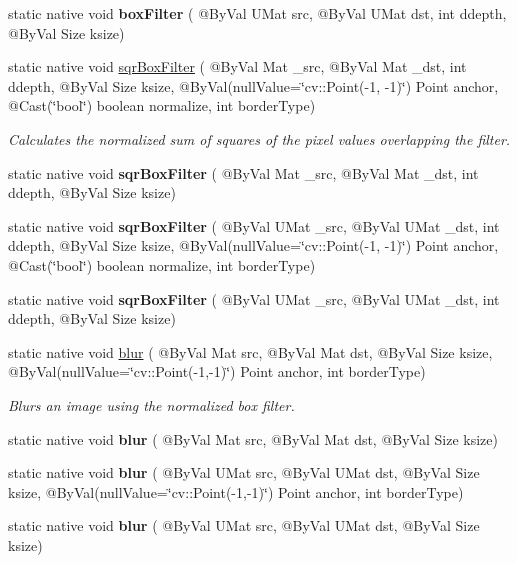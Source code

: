 \begin{DoxyCompactItemize}
\item 
static native void {\bfseries box\+Filter} ( @By\+Val U\+Mat src, @By\+Val U\+Mat dst, int ddepth, @By\+Val Size ksize)
\item 
static native void \hyperlink{group__imgproc__filter_gac3bb5f90c81da13be223978755c103e2}{sqr\+Box\+Filter} ( @By\+Val Mat \+\_\+src, @By\+Val Mat \+\_\+dst, int ddepth, @By\+Val Size ksize, @By\+Val(null\+Value=\char`\"{}cv\+::\+Point(-\/1, -\/1)\char`\"{}) Point anchor, @Cast(\char`\"{}bool\char`\"{}) boolean normalize, int border\+Type)
\begin{DoxyCompactList}\small\item\em Calculates the normalized sum of squares of the pixel values overlapping the filter. \end{DoxyCompactList}\item 
static native void {\bfseries sqr\+Box\+Filter} ( @By\+Val Mat \+\_\+src, @By\+Val Mat \+\_\+dst, int ddepth, @By\+Val Size ksize)
\item 
static native void {\bfseries sqr\+Box\+Filter} ( @By\+Val U\+Mat \+\_\+src, @By\+Val U\+Mat \+\_\+dst, int ddepth, @By\+Val Size ksize, @By\+Val(null\+Value=\char`\"{}cv\+::\+Point(-\/1, -\/1)\char`\"{}) Point anchor, @Cast(\char`\"{}bool\char`\"{}) boolean normalize, int border\+Type)
\item 
static native void {\bfseries sqr\+Box\+Filter} ( @By\+Val U\+Mat \+\_\+src, @By\+Val U\+Mat \+\_\+dst, int ddepth, @By\+Val Size ksize)
\item 
static native void \hyperlink{group__imgproc__filter_ga2878e087c0294ad9e5f1996c07b303b4}{blur} ( @By\+Val Mat src, @By\+Val Mat dst, @By\+Val Size ksize, @By\+Val(null\+Value=\char`\"{}cv\+::\+Point(-\/1,-\/1)\char`\"{}) Point anchor, int border\+Type)
\begin{DoxyCompactList}\small\item\em Blurs an image using the normalized box filter. \end{DoxyCompactList}\item 
static native void {\bfseries blur} ( @By\+Val Mat src, @By\+Val Mat dst, @By\+Val Size ksize)
\item 
static native void {\bfseries blur} ( @By\+Val U\+Mat src, @By\+Val U\+Mat dst, @By\+Val Size ksize, @By\+Val(null\+Value=\char`\"{}cv\+::\+Point(-\/1,-\/1)\char`\"{}) Point anchor, int border\+Type)
\item 
static native void {\bfseries blur} ( @By\+Val U\+Mat src, @By\+Val U\+Mat dst, @By\+Val Size ksize)
\item 

\end{DoxyCompactItemize}

